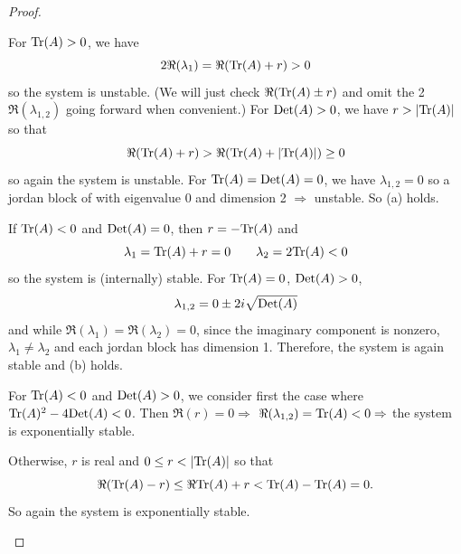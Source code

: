 \documentclass{homework}
\begin{document}
\begin{proof}
    \begin{letterenum}
        \item For $\text{Tr}(A) > 0$, we have
        \begin{equation}
            2\Re(\lambda_1) = \Re(\text{Tr}(A) + r) > 0
        \end{equation}
        so the system is unstable. (We will just check $\Re(\text{Tr}(A) \pm r)$ and omit the
        2$\Re(\lambda_{1,2})$ going forward when convenient.)
        For $\text{Det}(A) > 0$, we have $r > |\text{Tr}(A)|$ so that
        \begin{equation}
            \Re(\text{Tr}(A) + r) > \Re(\text{Tr}(A) + |\text{Tr}(A)|) \geq 0
        \end{equation}
        so again the system is unstable. For $\text{Tr}(A) = \text{Det}(A) = 0$, we have
        $\lambda_{1,2} = 0$ so a jordan block of with eigenvalue 0 and dimension
        2 $\Rightarrow$ unstable. So (a) holds.
        \item If $\text{Tr}(A) < 0$ and $\text{Det}(A) = 0$, then $r = -\text{Tr}(A)$ and
        \begin{equation}
            \lambda_1 = \text{Tr}(A) + r = 0 \qquad \lambda_2 = 2\text{Tr}(A) < 0
        \end{equation}
        so the system is (internally) stable. For $\text{Tr}(A) = 0$, $\text{Det}(A) > 0$,
        \begin{equation}
            \lambda_{1,2} = 0 \pm 2i\sqrt{\text{Det}(A)}
        \end{equation}
        and while $\Re(\lambda_1) = \Re(\lambda_2) = 0$, since the imaginary
        component is nonzero, $\lambda_1 \neq \lambda_2$ and each jordan
        block has dimension 1. Therefore, the system is again stable and (b)
        holds.

        \item For $\text{Tr}(A) < 0$ and $\text{Det}(A) > 0$, we consider first the case
            where $\text{Tr}(A)^2 - 4\text{Det}(A) < 0$. Then $\Re(r) = 0 \Rightarrow$
            $\Re(\lambda_{1,2}) = \text{Tr}(A) < 0 \Rightarrow$ the system is
            exponentially stable.

            Otherwise, $r$ is real and $0 \leq r < |\text{Tr}(A)|$ so that
            \begin{equation}
                \Re(\text{Tr}(A) - r) \leq \Re{\text{Tr}(A)+ r} < \text{Tr}(A) - \text{Tr}(A) = 0.
            \end{equation}
            So again the system is exponentially stable.
    \end{letterenum}



\end{proof}
\end{document}

